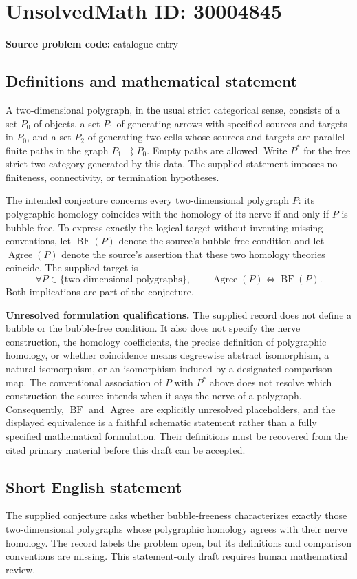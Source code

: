 \documentclass[11pt]{article}
\begin{document}
\section*{UnsolvedMath ID: 30004845}
\textbf{Source problem code:} catalogue entry
\subsection{Definitions and mathematical statement}
A two-dimensional polygraph, in the usual strict categorical sense, consists of a set \(P_0\) of objects, a set \(P_1\) of generating arrows with specified sources and targets in \(P_0\), and a set \(P_2\) of generating two-cells whose sources and targets are parallel finite paths in the graph \(P_1\rightrightarrows P_0\). Empty paths are allowed. Write \(P^*\) for the free strict two-category generated by this data. The supplied statement imposes no finiteness, connectivity, or termination hypotheses.

The intended conjecture concerns every two-dimensional polygraph \(P\): its polygraphic homology coincides with the homology of its nerve if and only if \(P\) is bubble-free. To express exactly the logical target without inventing missing conventions, let \(\operatorname{BF}(P)\) denote the source's bubble-free condition and let \(\operatorname{Agree}(P)\) denote the source's assertion that these two homology theories coincide. The supplied target is
\[
\forall P\in\{\text{two-dimensional polygraphs}\},\qquad
\operatorname{Agree}(P)\Longleftrightarrow\operatorname{BF}(P).
\]
Both implications are part of the conjecture.

\textbf{Unresolved formulation qualifications.} The supplied record does not define a bubble or the bubble-free condition. It also does not specify the nerve construction, the homology coefficients, the precise definition of polygraphic homology, or whether coincidence means degreewise abstract isomorphism, a natural isomorphism, or an isomorphism induced by a designated comparison map. The conventional association of \(P\) with \(P^*\) above does not resolve which construction the source intends when it says the nerve of a polygraph. Consequently, \(\operatorname{BF}\) and \(\operatorname{Agree}\) are explicitly unresolved placeholders, and the displayed equivalence is a faithful schematic statement rather than a fully specified mathematical formulation. Their definitions must be recovered from the cited primary material before this draft can be accepted.
\subsection{Short English statement}
The supplied conjecture asks whether bubble-freeness characterizes exactly those two-dimensional polygraphs whose polygraphic homology agrees with their nerve homology. The record labels the problem open, but its definitions and comparison conventions are missing. This statement-only draft requires human mathematical review.
\end{document}
